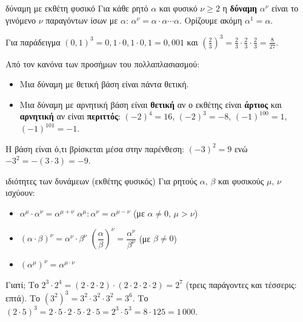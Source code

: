 
\begin{orismos}{δύναμη με εκθέτη φυσικό}
Για κάθε ρητό $\alpha$ και φυσικό $\nu\ge2$ η \textbf{δύναμη} $\alpha^\nu$ είναι το γινόμενο $\nu$ παραγόντων ίσων με $\alpha$: $\alpha^\nu=\alpha\cdot\alpha\cdots\alpha$. Ορίζουμε ακόμη $\alpha^1=\alpha$.
\end{orismos}

Για παράδειγμα $(0{,}1)^3=0{,}1\cdot0{,}1\cdot0{,}1=0{,}001$ και $\left(\frac{2}{3}\right)^3=\frac{2}{3}\cdot\frac{2}{3}\cdot\frac{2}{3}=\frac{8}{27}$.


Από τον κανόνα των προσήμων του πολλαπλασιασμού:
\begin{itemize}[leftmargin=1.2em,itemsep=0.3ex,topsep=2pt]
\item Μια δύναμη με θετική βάση είναι πάντα θετική.
\item Μια δύναμη με αρνητική βάση είναι \textbf{θετική} αν ο εκθέτης είναι \textbf{άρτιος} και \textbf{αρνητική} αν είναι \textbf{περιττός}: $(-2)^4=16$, $(-2)^3=-8$, $(-1)^{100}=1$, $(-1)^{101}=-1$.
\end{itemize}

Η βάση είναι ό,τι βρίσκεται μέσα στην παρένθεση: $(-3)^2=9$ ενώ $-3^2=-(3\cdot3)=-9$.

\begin{idiotita}{ιδιότητες των δυνάμεων (εκθέτης φυσικός)}
Για ρητούς $\alpha,\,\beta$ και φυσικούς $\mu,\,\nu$ ισχύουν:
\begin{itemize}[leftmargin=1.2em,itemsep=0.3ex,topsep=2pt]
\item $\alpha^\mu\cdot\alpha^\nu=\alpha^{\mu+\nu}$ \qquad $\alpha^\mu:\alpha^\nu=\alpha^{\mu-\nu}$ (με $\alpha\neq0$, $\mu>\nu$)
\item $(\alpha\cdot\beta)^\nu=\alpha^\nu\cdot\beta^\nu$ \qquad $\left(\dfrac{\alpha}{\beta}\right)^\nu=\dfrac{\alpha^\nu}{\beta^\nu}$ (με $\beta\neq0$)
\item $(\alpha^\mu)^\nu=\alpha^{\mu\cdot\nu}$
\end{itemize}
\end{idiotita}

Γιατί; Το $2^3\cdot2^4=(2\cdot2\cdot2)\cdot(2\cdot2\cdot2\cdot2)=2^7$ (τρεις παράγοντες και τέσσερις: επτά). Το $(3^2)^3=3^2\cdot3^2\cdot3^2=3^6$. Το $(2\cdot5)^3=2\cdot5\cdot2\cdot5\cdot2\cdot5=2^3\cdot5^3=8\cdot125=1\,000$.


